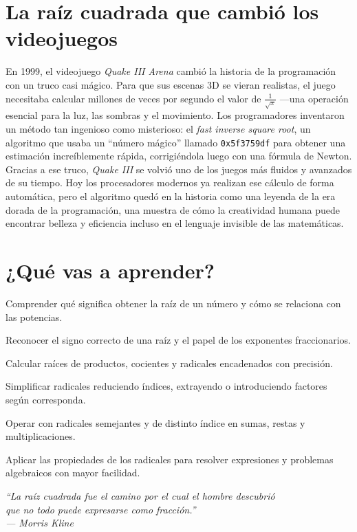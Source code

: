 \section*{La raíz cuadrada que cambió los videojuegos}

\begin{reseñaplana}
En 1999, el videojuego \textit{Quake III Arena} cambió la historia de la programación con un truco casi mágico. 
Para que sus escenas 3D se vieran realistas, el juego necesitaba calcular millones de veces por segundo el valor 
de $ \frac{1}{\sqrt{x}} $ —una operación esencial para la luz, las sombras y el movimiento. Los programadores 
inventaron un método tan ingenioso como misterioso: el \textit{fast inverse square root}, un algoritmo que usaba 
un ``número mágico'' llamado \texttt{0x5f3759df} para obtener una estimación increíblemente rápida, corrigiéndola 
luego con una fórmula de Newton.  
Gracias a ese truco, \textit{Quake III} se volvió uno de los juegos más fluidos y avanzados de su tiempo. 
Hoy los procesadores modernos ya realizan ese cálculo de forma automática, pero el algoritmo quedó en la historia 
como una leyenda de la era dorada de la programación, una muestra de cómo la creatividad humana puede encontrar belleza
y eficiencia incluso en el lenguaje invisible de las matemáticas.
\end{reseñaplana}

\section*{¿Qué vas a aprender?}
\begin{aprende}
  \item Comprender qué significa obtener la raíz de un número y cómo se relaciona con las potencias.  
  \item Reconocer el signo correcto de una raíz y el papel de los exponentes fraccionarios.  
  \item Calcular raíces de productos, cocientes y radicales encadenados con precisión.  
  \item Simplificar radicales reduciendo índices, extrayendo o introduciendo factores según corresponda.  
  \item Operar con radicales semejantes y de distinto índice en sumas, restas y multiplicaciones.  
  \item Aplicar las propiedades de los radicales para resolver expresiones y problemas algebraicos con mayor facilidad.  
\end{aprende}

\vspace{1.5cm} %
\begin{flushright}
  {\fontsize{12}{14}\selectfont\itshape
  ``La raíz cuadrada fue el camino por el cual el hombre descubrió\\ 
  que no todo puede expresarse como fracción.''\\[6pt]
  — Morris Kline}%
\end{flushright}
